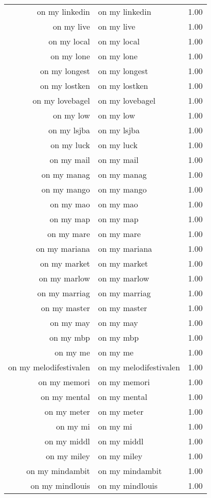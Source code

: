 \begin{table}[ht]
\begin{tabular}{rlr}
  on my linkedin & on my linkedin & 1.00 \\ 
  on my live & on my live & 1.00 \\ 
  on my local & on my local & 1.00 \\ 
  on my lone & on my lone & 1.00 \\ 
  on my longest & on my longest & 1.00 \\ 
  on my lostken & on my lostken & 1.00 \\ 
  on my lovebagel & on my lovebagel & 1.00 \\ 
  on my low & on my low & 1.00 \\ 
  on my lsjba & on my lsjba & 1.00 \\ 
  on my luck & on my luck & 1.00 \\ 
  on my mail & on my mail & 1.00 \\ 
  on my manag & on my manag & 1.00 \\ 
  on my mango & on my mango & 1.00 \\ 
  on my mao & on my mao & 1.00 \\ 
  on my map & on my map & 1.00 \\ 
  on my mare & on my mare & 1.00 \\ 
  on my mariana & on my mariana & 1.00 \\ 
  on my market & on my market & 1.00 \\ 
  on my marlow & on my marlow & 1.00 \\ 
  on my marriag & on my marriag & 1.00 \\ 
  on my master & on my master & 1.00 \\ 
  on my may & on my may & 1.00 \\ 
  on my mbp & on my mbp & 1.00 \\ 
  on my me & on my me & 1.00 \\ 
  on my melodifestivalen & on my melodifestivalen & 1.00 \\ 
  on my memori & on my memori & 1.00 \\ 
  on my mental & on my mental & 1.00 \\ 
  on my meter & on my meter & 1.00 \\ 
  on my mi & on my mi & 1.00 \\ 
  on my middl & on my middl & 1.00 \\ 
  on my miley & on my miley & 1.00 \\ 
  on my mindambit & on my mindambit & 1.00 \\ 
  on my mindlouis & on my mindlouis & 1.00 \\ 

\end{tabular}
\end{table}
